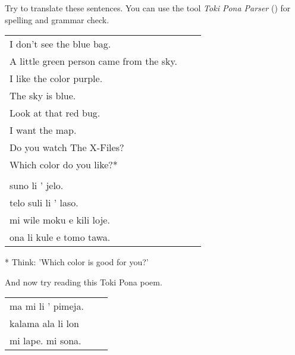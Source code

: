 Try to translate these sentences. 
You can use the tool \textit{Toki Pona Parser} (\cite{www:rowa:02}) for spelling and grammar check. 

\begin{supertabular}{p{5,5cm}|ll}
I don't see the blue bag. &&   \\ %
A little green person came from the sky. &&   \\ %
I like the color purple.  &&  \\ %
The sky is blue. &&   \\ %
Look at that red bug.  &&  \\ %
I want the map.  &&  \\ %
Do you watch The X-Files? &&  \\  %
Which color do you like?* &&  \\  %
 && \\ %
suno li ' jelo. &&   \\ %
telo suli li ' laso.  &&  \\ %
mi wile moku e kili loje.  &&  \\ %
ona li kule e tomo tawa. &&   \\ %
\end{supertabular} 

* Think: 'Which color is good for you?' 

And now try reading this Toki Pona poem. 

\begin{supertabular}{p{5,5cm}|ll}
ma mi li ' pimeja. && \\ %
kalama ala li lon && \\ %
mi lape. mi sona. && \\ %
\end{supertabular} 
